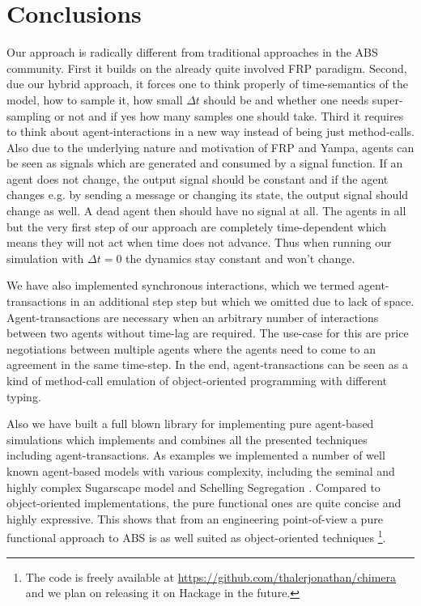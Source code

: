 \section{Conclusions}
Our approach is radically different from traditional approaches in the ABS community. First it builds on the already quite involved FRP paradigm. Second, due our hybrid approach, it forces one to think properly of time-semantics of the model, how to sample it, how small $\Delta t$ should be and whether one needs super-sampling or not and if yes how many samples one should take. Third it requires to think about agent-interactions in a new way instead of being just method-calls. Also due to the underlying nature and motivation of FRP and Yampa, agents can be seen as signals which are generated and consumed by a signal function. If an agent does not change, the output signal should be constant and if the agent changes e.g. by sending a message or changing its state, the output signal should change as well. A dead agent then should have no signal at all. The agents in all but the very first step of our approach are completely time-dependent which means they will not act when time does not advance. Thus when running our simulation with $\Delta t = 0$ the dynamics stay constant and won't change.

We have also implemented synchronous interactions, which we termed agent-transactions in an additional step step but which we omitted due to lack of space. Agent-transactions are necessary when an arbitrary number of interactions between two agents without time-lag are required. The use-case for this are price negotiations between multiple agents where the agents need to come to an agreement in the same time-step. In the end, agent-transactions can be seen as a kind of method-call emulation of object-oriented programming with different typing.

Also we have built a full blown library for implementing pure agent-based simulations which implements and combines all the presented techniques including agent-transactions. As examples we implemented a number of well known agent-based models with various complexity, including the seminal and highly complex Sugarscape model \cite{epstein_growing_1996} and Schelling Segregation \cite{schelling_dynamic_1971}. Compared to object-oriented implementations, the pure functional ones are quite concise and highly expressive. This shows that from an engineering point-of-view a pure functional approach to ABS is as well suited as object-oriented techniques \footnote{The code is freely available at \url{https://github.com/thalerjonathan/chimera} and we plan on releasing it on Hackage in the future.}.

